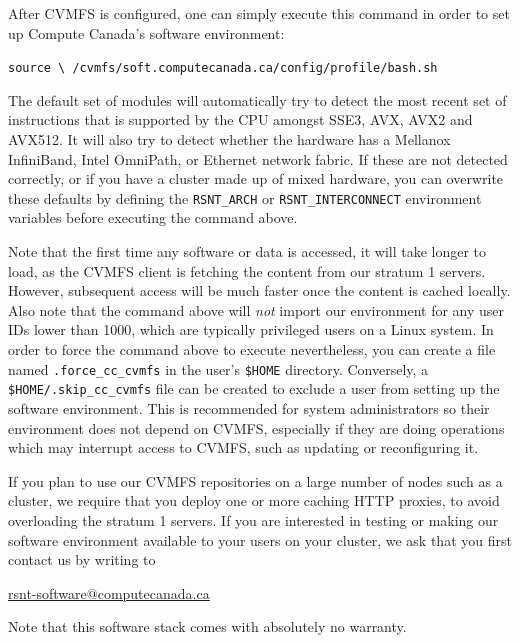 \documentclass[sigconf]{acmart}
\begin{document}
After CVMFS is configured, one can simply execute this command in order to set up Compute Canada's software environment: 

\begin{center}
\texttt{source \textbackslash \linebreak
/cvmfs/soft.computecanada.ca/config/profile/bash.sh}
\end{center}

The default set of modules will automatically try to detect the most recent set of instructions that is supported by the CPU amongst  SSE3, AVX, AVX2 and AVX512. It will also try to detect whether the hardware has a Mellanox InfiniBand, Intel OmniPath, or Ethernet network fabric. If these are not detected correctly, or if you have a cluster made up of mixed hardware, you can overwrite these defaults by defining the \texttt{RSNT\_ARCH} or \texttt{RSNT\_INTERCONNECT} environment variables before executing the command above. 

Note that the first time any software or data is accessed, it will take longer to load, as the CVMFS client is fetching the content from our stratum 1 servers. However, subsequent access will be much faster once the content is cached locally. 
Also note that the command above will {\it not} import our environment for any user IDs lower than 1000, which are typically privileged users on a Linux system. In order to force the command above to execute nevertheless, you can create a file named \texttt{.force\_cc\_cvmfs} in the user's \texttt{\$HOME} directory. Conversely, a \texttt{\$HOME/.skip\_cc\_cvmfs} file can be created to exclude a user from setting up the software environment. This is recommended for system administrators so their environment does not depend on CVMFS, especially if they are doing operations which may interrupt access to CVMFS, such as updating or reconfiguring it.

If you plan to use our CVMFS repositories on a large number of nodes such as a cluster, we require that you deploy one or more caching HTTP proxies, to avoid overloading the stratum 1 servers. If you are interested in testing or making our software environment available to your users on your cluster, we ask that you first contact us by writing to 
\begin{center}
\url{rsnt-software@computecanada.ca}    
\end{center}
Note that this software stack comes with absolutely no warranty. 
\end{document}
